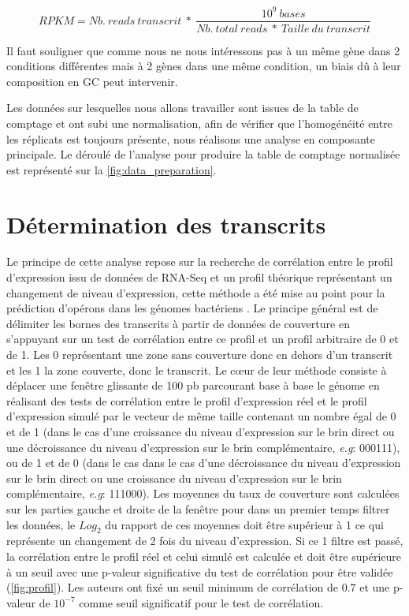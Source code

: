 \documentclass[12pt,a4paper]{report}
\begin{document}
\begin{onehalfspace}
\[RPKM = Nb.~reads~transcrit~*~\frac{10^9~bases}{Nb.~total~reads~*~Taille~du~transcrit}\]

Il faut souligner que comme nous ne nous intéressons pas à un même gène dans 2 conditions différentes mais à 2 gènes dans une même condition, un biais dû à leur composition en GC peut intervenir.

Les données sur lesquelles nous allons travailler sont issues de la table de comptage et ont subi une normalisation, afin de vérifier que l'homogénéité entre les réplicats est toujours présente, nous réalisons une analyse en composante principale. Le déroulé de l'analyse pour produire la table de comptage normalisée est représenté sur la \autoref{fig:data_preparation}.

\section*{Détermination des transcrits}
\label{methode_correlation}
Le principe de cette analyse repose sur la recherche de corrélation entre le profil d'expression issu de données de RNA-Seq et un profil théorique représentant un changement de niveau d'expression, cette méthode a été mise au point pour la prédiction d'opérons dans les génomes bactériens \citep{Fortino2014}. Le principe général est de délimiter les bornes des transcrits à partir de données de couverture en s'appuyant sur un test de corrélation entre ce profil et un profil arbitraire de 0 et de 1. Les 0 représentant une zone sans couverture donc en dehors d'un transcrit et les 1 la zone couverte, donc le transcrit. Le cœur de leur méthode consiste à déplacer une fenêtre glissante de 100 pb parcourant base à base le génome en réalisant des tests de corrélation entre le profil d'expression réel et le profil d'expression simulé par le vecteur de même taille contenant un nombre égal de 0 et de 1 (dans le cas d'une croissance du niveau d'expression sur le brin direct ou une décroissance du niveau d'expression sur le brin complémentaire, \textit{e.g}: 000111), ou de 1 et de 0 (dans le cas dans le cas d'une décroissance du niveau d'expression sur le brin direct ou une croissance du niveau d'expression sur le brin complémentaire, \textit{e.g}: 111000). Les moyennes du taux de couverture sont calculées sur les parties gauche et droite de la fenêtre pour dans un premier temps filtrer les données, le $Log_2$ du rapport de ces moyennes doit être supérieur à 1 ce qui représente un changement de 2 fois du niveau d'expression. Si ce 1 filtre est passé, la corrélation entre le profil réel et celui simulé est calculée et doit être supérieure à un seuil avec une p-valeur significative du test de corrélation pour être validée (\autoref{fig:profil}). Les auteurs ont fixé un seuil minimum de corrélation de 0.7 et une p-valeur de $10^{-7}$ comme seuil significatif pour le test de corrélation.


\end{onehalfspace}
\end{document}
